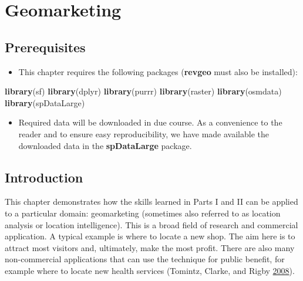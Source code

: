 \documentclass[]{krantz}
\newenvironment{Shaded}{\begin{snugshade}}{\end{snugshade}}
\newcommand{\KeywordTok}[1]{\textcolor[rgb]{0.27,0.27,0.27}{\textbf{#1}}}
\newcommand{\NormalTok}[1]{#1}
\providecommand{\tightlist}{%
  \setlength{\itemsep}{0pt}\setlength{\parskip}{0pt}}
\begin{document}
\hypertarget{location}{%
\section{Geomarketing}\label{location}}

\hypertarget{prerequisites-11}{%
\subsection*{Prerequisites}\label{prerequisites-11}}

\begin{itemize}
\tightlist
\item
  This chapter requires the following packages (\textbf{revgeo} must also be installed):
\end{itemize}

\begin{Shaded}
\begin{Highlighting}[]
\KeywordTok{library}\NormalTok{(sf)}
\KeywordTok{library}\NormalTok{(dplyr)}
\KeywordTok{library}\NormalTok{(purrr)}
\KeywordTok{library}\NormalTok{(raster)}
\KeywordTok{library}\NormalTok{(osmdata)}
\KeywordTok{library}\NormalTok{(spDataLarge)}
\end{Highlighting}
\end{Shaded}

\begin{itemize}
\tightlist
\item
  Required data will be downloaded in due course.
  As a convenience to the reader and to ensure easy reproducibility, we have made available the downloaded data in the \textbf{spDataLarge} package.
\end{itemize}

\hypertarget{introduction-8}{%
\subsection{Introduction}\label{introduction-8}}

This chapter demonstrates how the skills learned in Parts I and II can be applied to a particular domain: geomarketing (sometimes also referred to as location analysis or location intelligence).
This is a broad field of research and commercial application.
A typical example is where to locate a new shop.
The aim here is to attract most visitors and, ultimately, make the most profit.
There are also many non-commercial applications that can use the technique for public benefit, for example where to locate new health services (Tomintz, Clarke, and Rigby \protect\hyperlink{ref-tomintz_geography_2008}{2008}).
\end{document}
